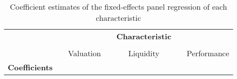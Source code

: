 \documentclass[a4paper,11pt]{report}
\begin{document}
\begin{table}[h!]
\centering
    
\caption{Coefficient estimates of the fixed-effects panel regression of each characteristic}
\label{tab: panelregression}
\begin{tabular}{llclllc}
\toprule
                                          &  &                              &  & \multicolumn{1}{c}{\textbf{Characteristic}} &  &                              \\\cline{3-7}\\
                                          &  & Valuation                   &  & \multicolumn{1}{c}{Liquidity}               &  & Performance                  \\ \midrule
\textbf{Coefficients}                     &  &                              &  & \multicolumn{1}{c}{}                        &  &                              \\ \midrule


\end{tabular}
\end{table}
\end{document}
